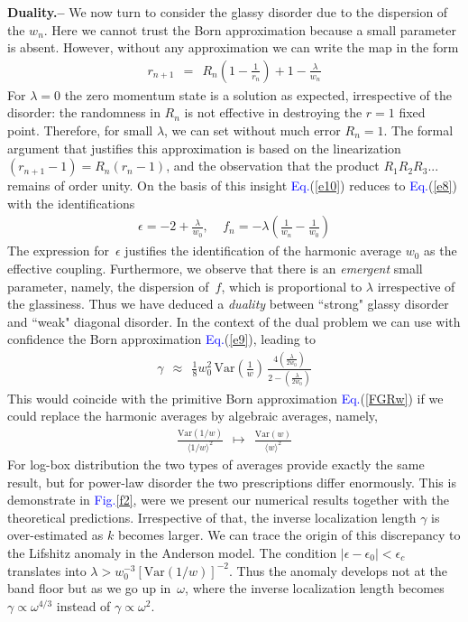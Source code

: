 \documentclass[twocolumn,showpacs,aps,pre]{revtex4-1}
\newcommand{\be}[1]{\begin{eqnarray} \label{e#1}}
\newcommand{\beq}{\begin{eqnarray}}
\newcommand{\eeq}{\end{eqnarray}}
\newcommand{\Eq}[1]{{\textcolor{blue}{Eq.}}(\ref{#1})}
\newcommand{\Fig}[1] {{\textcolor{blue}{Fig.}}\ref{#1}}
\newcommand{\sect}[1]{{\bf #1.-- }}
\begin{document}
\sect{Duality}
%
We now turn to consider the glassy disorder due to the dispersion of the $w_n$. 
Here we cannot trust the Born approximation because a small parameter is absent. 
However, without any approximation we can write the map in the form 
%
\be{10}
r_{n+1} \ \ = \ \ R_n \left( 1 - \frac{1}{r_n}\right) + 1 -\frac{\lambda}{w_n} 
\eeq
%
For $\lambda{=}0$ the zero momentum state is a solution as expected, 
irrespective of the disorder: the randomness in $R_n$ is not effective 
in destroying the ${r=1}$ fixed point. Therefore, for small $\lambda$, 
we can set without much error ${R_n=1}$. The formal argument that justifies 
this approximation is based on the linearization ${(r_{n+1}-1)=R_n(r_n-1)}$, 
and the observation that the product ${R_1R_2R_3...}$ remains of order unity. 
On the basis of this insight \Eq{e10} reduces to \Eq{e8} with the identifications 
%
\beq
\epsilon = -2 + \frac{\lambda}{w_0}, 
\ \ \ \ \ f_n = -\lambda \left(\frac{1}{w_n}-\frac{1}{w_0} \right)
\eeq 
%
The expression for~$\epsilon$ justifies the identification of the harmonic average $w_0$ 
as the effective coupling. Furthermore, we observe that there is an {\em emergent} small parameter, 
namely, the dispersion of~$f$, which is proportional to $\lambda$ irrespective of the glassiness. 
Thus we have deduced a {\em duality} between ``strong" glassy disorder and ``weak" diagonal disorder.
%
In the context of the dual problem we can use with confidence the Born approximation \Eq{e9}, leading to  
%
\be{12}
\gamma \ \ \approx \ \ \frac{1}{8} w_0^2 \, \mbox{Var}\left(\frac{1}{w}\right)  
\, \frac{4\left(\frac{\lambda}{2w_0}\right)}{2-\left(\frac{\lambda}{2w_0}\right)}
\eeq
% 
This would coincide with the primitive Born approximation \Eq{FGRw} 
if we could replace the harmonic averages by algebraic averages, namely,  
%
\beq
\frac{\mbox{Var}(1/w)}{\langle 1/w \rangle^2} 
\ \ \mapsto \ \ 
\frac{\mbox{Var}(w)}{\langle w \rangle^2} 
\eeq 
%
For log-box distribution the two types of averages provide exactly the same result, but for 
power-law disorder the two prescriptions differ enormously. This is demonstrate in \Fig{f2}, 
were we present our numerical results together with the theoretical predictions. 
%
Irrespective of that, the inverse localization length $\gamma$ is over-estimated as $k$ becomes larger. 
We can trace the origin of this discrepancy to the Lifshitz anomaly in the Anderson model.
The condition ${|\epsilon-\epsilon_0|<\epsilon_c}$ translates into ${\lambda > w_0^{-3}[\mbox{Var}(1/w)]^{-2}}$.
Thus the anomaly develops not at the band floor but as we go up in~$\omega$, 
where the inverse localization length becomes $\gamma \propto \omega^{4/3}$ 
instead of $\gamma \propto \omega^2$. 
\end{document}
